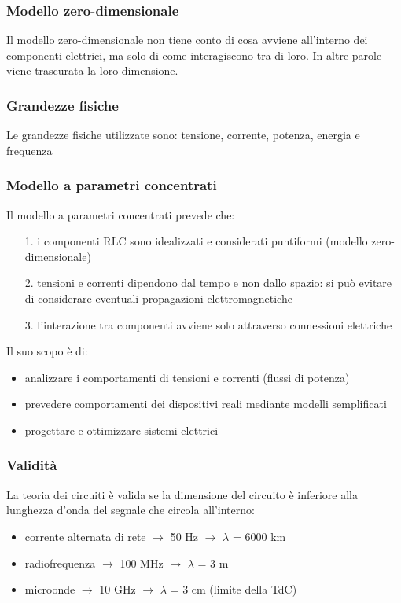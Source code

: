 \documentclass[a4paper]{article}
\begin{document}
\subsubsection*{Modello zero-dimensionale}
Il modello zero-dimensionale non tiene conto di cosa avviene all'interno dei componenti elettrici, ma solo di come interagiscono
tra di loro. In altre parole viene trascurata la loro dimensione.

\subsubsection*{Grandezze fisiche}
Le grandezze fisiche utilizzate sono: tensione, corrente, potenza, energia e frequenza

\subsubsection*{Modello a parametri concentrati}
Il modello a parametri concentrati prevede che:
\begin{itemize}
	\item[1.] i componenti RLC sono idealizzati e considerati puntiformi (modello zero-dimensionale)
	\item[2.] tensioni e correnti dipendono dal tempo e non dallo spazio: si può evitare di considerare eventuali propagazioni
	elettromagnetiche
	\item[3.] l'interazione tra componenti avviene solo attraverso connessioni elettriche
\end{itemize}
Il suo scopo è di:
\begin{itemize}
	\item analizzare i comportamenti di tensioni e correnti (flussi di potenza)
	\item prevedere comportamenti dei dispositivi reali mediante modelli semplificati
	\item progettare e ottimizzare sistemi elettrici
\end{itemize}

\subsubsection*{Validità}
La teoria dei circuiti è valida se la dimensione del circuito è inferiore alla lunghezza d'onda del segnale che circola all'interno:
\begin{itemize}
	\item corrente alternata di rete \(\rightarrow\) 50 Hz \(\rightarrow\) \(\lambda\) = 6000 km
	\item radiofrequenza \(\rightarrow\) 100 MHz \(\rightarrow\) \(\lambda\) = 3 m
	\item microonde \(\rightarrow\) 10 GHz \(\rightarrow\) \(\lambda\) = 3 cm (limite della TdC)
\end{itemize}
\end{document}
